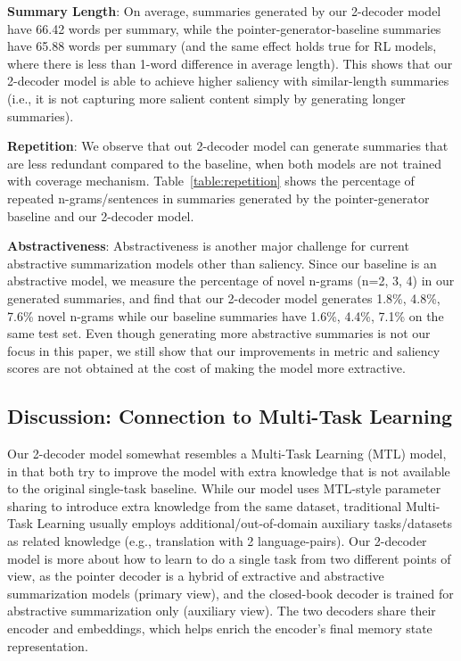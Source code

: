 \documentclass[11pt,a4paper]{article}
\def\tabref#1{Table~\ref{#1}}
\begin{document}
\noindent\textbf{Summary Length}:
On average, summaries generated by our 2-decoder model have 66.42 words per summary, while the pointer-generator-baseline summaries have 65.88 words per summary (and the same effect holds true for RL models, where there is less than 1-word difference in average length). This shows that our 2-decoder model is able to achieve higher saliency with similar-length summaries (i.e., it is not capturing more salient content simply by generating longer summaries).

\noindent\textbf{Repetition}:
We observe that out 2-decoder model can generate summaries that are less redundant compared to the baseline, when both models are not trained with coverage mechanism. \tabref{table:repetition} shows the percentage of repeated n-grams/sentences in summaries generated by the pointer-generator baseline and our 2-decoder model. 

\noindent\textbf{Abstractiveness}:
Abstractiveness is another major challenge for current abstractive summarization models other than saliency. 
Since our baseline is an abstractive model, we measure the percentage of novel n-grams (n=2, 3, 4) in our generated summaries, and find that our 2-decoder model generates 1.8\%, 4.8\%, 7.6\% novel n-grams while our baseline summaries have 1.6\%, 4.4\%, 7.1\% on the same test set. Even though generating more abstractive summaries is not our focus in this paper, we still show that our improvements in metric and saliency scores are not obtained at the cost of making the model more extractive.


 \subsection{Discussion: Connection to Multi-Task Learning}
Our 2-decoder model somewhat resembles a Multi-Task Learning (MTL) model, in that both try to improve the model with extra knowledge that is not available to the original single-task baseline. 
While our model uses MTL-style parameter sharing to introduce extra knowledge from the same dataset, traditional Multi-Task Learning usually employs additional/out-of-domain auxiliary tasks/datasets as related knowledge (e.g., translation with 2 language-pairs). Our 2-decoder model is more about how to learn to do a single task from two different points of view, as the pointer decoder is a hybrid of extractive and abstractive summarization models (primary view), and the closed-book decoder is trained for abstractive summarization only (auxiliary view). The two decoders share their encoder and embeddings, which helps enrich the encoder's final memory state representation.
\end{document}
